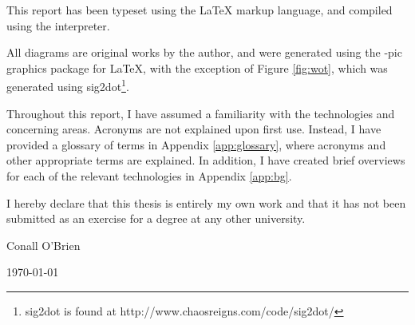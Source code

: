 
This report has been typeset using the \textrm{\LaTeX{}} markup language, 
and compiled using the \textrm{\LaTeXe{}} interpreter. 


All diagrams are original works by the author, and were generated 
using the \textrm{\Xy-pic{}} graphics package for \textrm{\LaTeX{}},
with the exception of Figure \ref{fig:wot}, which was generated using
sig2dot\footnote{sig2dot is found at http://www.chaosreigns.com/code/sig2dot/}.



Throughout this report, I have assumed a familiarity with the
technologies and concerning areas. Acronyms are not explained upon first
use. Instead, I have provided a glossary of terms in Appendix
\ref{app:glossary}, where acronyms and other appropriate terms are
explained. In addition, I have created brief overviews for each 
of the relevant technologies in Appendix \ref{app:bg}.



\vfill


I hereby declare that this thesis is entirely my own work and that it
has not been submitted as an exercise for a degree at any other
university.

\vspace{35mm}

\begin{flushright}

\underline{\hspace*{75mm}}

Conall O'Brien

\today

\end{flushright}
